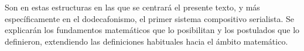 		Son en estas estructuras en las que se centrará el presente texto, y más específicamente en el dodecafonismo, el primer sistema compositivo serialista. Se explicarán los fundamentos matemáticos que lo posibilitan y los postulados que lo definieron, extendiendo las definiciones habituales hacia el ámbito matemático. %
        
        
        
        
    
    \renewcommand*\contentsname{\begin{LARGE}\textbf{Índice general}\end{LARGE}\vspace{-\bigskipamount}}
	\begin{changemargin}{-0.5cm}{-0.5cm}
		\tableofcontents
	\end{changemargin}
	\newpage
	$\ $
	\thispagestyle{empty}
	\newpage
	$\ $
	\thispagestyle{empty}
	\newpage
	
